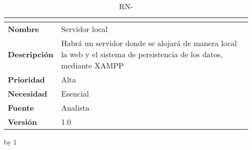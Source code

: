 \begin{table}[H]
	\caption{RN-\number\rn}
	\begin{tabular}{|l|p{}|}
		\hline
		\multicolumn{2}{|c|}{\cellcolor[HTML]{BFBFBF}{\color[HTML]{000000} \textbf{RN-\number\rn}}} \\ \hline
		\textbf{Nombre}      & Servidor local                                                                                                      \\ \hline
		\textbf{Descripción} & Habrá un servidor donde se alojará de manera local la web y el sistema de persistencia de los datos, mediante XAMPP \\ \hline
		\textbf{Prioridad}   & Alta                                                                                                                \\ \hline
		\textbf{Necesidad}   & Esencial                                                                                                            \\ \hline
		\textbf{Fuente}      & Analista                                                                                                            \\ \hline
		\textbf{Versión}     & 1.0                                                                                                                 \\ \hline
	\end{tabular}
\end{table}
\advance\rn by 1
